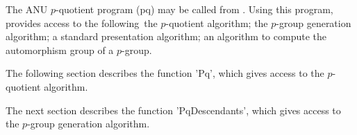 
The ANU $p$-quotient program (pq) may  be called from {\GAP}.  Using this
program,  {\GAP}  provides access to   the  following\:\ the $p$-quotient
algorithm;  the $p$-group  generation algorithm; a  standard presentation
algorithm; an algorithm to compute the automorphism group of a $p$-group.

The  following section describes the function 'Pq', which gives access to
the $p$-quotient algorithm.

The next section  describes  the  function 'PqDescendants',  which  gives
access to the $p$-group generation algorithm.

